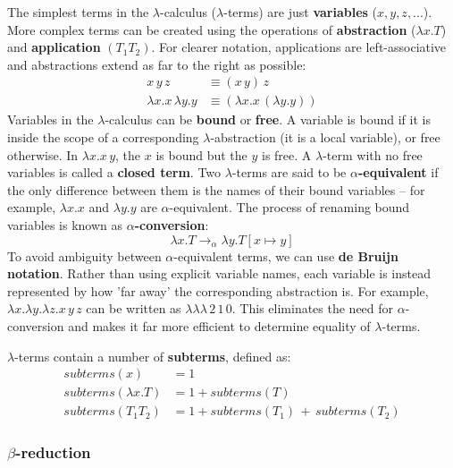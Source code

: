\documentclass[11pt]{article}
\begin{document}
The simplest terms in the $\lambda$-calculus ($\lambda$-terms) are just \textbf{variables} ($x, y, z, ...$). More complex terms can be created using the operations of \textbf{abstraction} ($\lambda x. T$) and \textbf{application} $(T_1 T_2)$. For clearer notation, applications are left-associative and abstractions extend as far to the right as possible:
%
\begin{align*}
    x \, y \, z &\equiv (x \, y) \, z \\
    \lambda x. x \, \lambda y. y &\equiv (\lambda x. x \, (\lambda y. y))
\end{align*}
%
Variables in the $\lambda$-calculus can be \textbf{bound} or \textbf{free}. A variable is bound if it is inside the scope of a corresponding $\lambda$-abstraction (it is a local variable), or free otherwise. In $\lambda x. x \, y$, the $x$ is bound but the $y$ is free. A $\lambda$-term with no free variables is called a \textbf{closed term}. Two $\lambda$-terms are said to be \textbf{$\alpha$-equivalent} if the only difference between them is the names of their bound variables -- for example, $\lambda x. x$ and $\lambda y. y$ are $\alpha$-equivalent. The process of renaming bound variables is known as \textbf{$\alpha$-conversion}:
%
$$\lambda x. T \to_\alpha \lambda y. T[x \mapsto y]$$
%
To avoid ambiguity between $\alpha$-equivalent terms, we can use \textbf{de Bruijn notation}. Rather than using explicit variable names, each variable is instead represented by how 'far away' the corresponding abstraction is. For example, $\lambda x. \lambda y. \lambda z. x \, y \, z$ can be written as $\lambda\lambda\lambda \, 2 \, 1 \, 0$. This eliminates the need for $\alpha$-conversion and makes it far more efficient to determine equality of $\lambda$-terms.

$\lambda$-terms contain a number of \textbf{subterms}, defined as:
%
\begin{align*}
    subterms(x) &= 1 \\
    subterms(\lambda x. T) &= 1 + subterms(T) \\
    subterms(T_1 T_2) &= 1 + subterms(T_1) \, + \, subterms(T_2)
\end{align*}

\subsubsection{\texorpdfstring{$\beta$}{Beta}-reduction}
\end{document}
